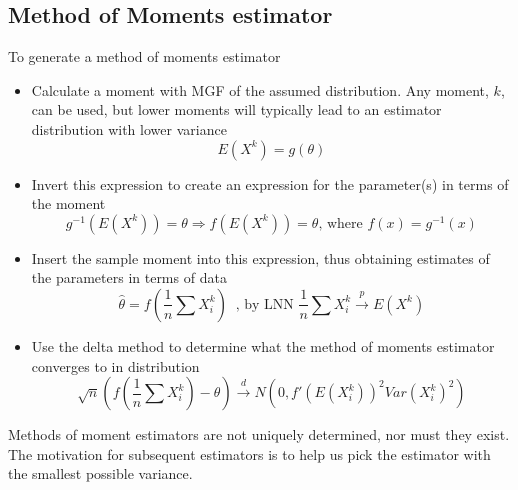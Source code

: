\documentclass{article}
\begin{document}
\subsection{Method of Moments estimator}

To generate a method of moments estimator
\begin{itemize}
    \item Calculate a moment with MGF of the assumed distribution. Any moment, $k$, can be used, but lower moments will typically lead to an estimator distribution with lower variance
    \begin{equation*}
        E(X^k) = g(\theta)
    \end{equation*}
    \item Invert this expression to create an expression for the parameter(s) in terms of the moment
    \begin{equation*}
        g^{-1}(E(X^k)) = \theta \Longrightarrow f(E(X^k)) = \theta \textrm{, where } f(x) = g^{-1}(x)
    \end{equation*}
    \item Insert the sample moment into this expression, thus obtaining estimates of the parameters in terms of data
    \begin{equation*}
        \hat{\theta} = f(\frac{1}{n}\sum X_i^k) \; \;\textrm{, by LNN } \frac{1}{n}\sum X_i^k \overset{p}{\longrightarrow} E(X^k)
    \end{equation*}
    \item Use the delta method to determine what the method of moments estimator converges to in distribution
    \begin{equation*}
        \sqrt{n}(f(\frac{1}{n}\sum X_i^k) - \theta) \overset{d}{\longrightarrow}  N(0, f'(E(X_i^k))^2Var(X_i^k)^2)
    \end{equation*}
\end{itemize}
Methods of moment estimators are not uniquely determined, nor must they exist. The motivation for subsequent estimators is to help us pick the estimator with the smallest possible variance.
\end{document}
